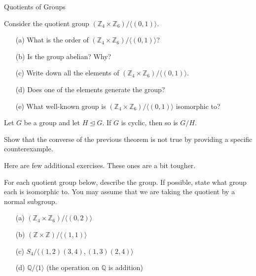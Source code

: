 \begin{section}{Quotients of Groups}
\begin{exercise}
Consider the quotient group $(\mathbb{Z}_4\times \mathbb{Z}_6)/\langle (0,1)\rangle$.
\begin{enumerate}
\item[(a)] What is the order of $(\mathbb{Z}_4\times \mathbb{Z}_6)/\langle (0,1)\rangle$?
\item[(b)] Is the group abelian?  Why?
\item[(c)] Write down all the elements of $(\mathbb{Z}_4\times \mathbb{Z}_6)/\langle (0,1)\rangle$.
\item[(d)] Does one of the elements generate the group?
\item[(e)] What well-known group is $(\mathbb{Z}_4\times \mathbb{Z}_6)/\langle (0,1)\rangle$ isomorphic to?
\end{enumerate}
\end{exercise}

\begin{theorem}
Let $G$ be a group and let $H\trianglelefteq G$.  If $G$ is cyclic, then so is $G/H$.
\end{theorem}

\begin{problem}
Show that the converse of the previous theorem is not true by providing a specific counterexample.
\end{problem}

Here are few additional exercises.  These ones are a bit tougher.

\begin{exercise}
For each quotient group below, describe the group.  If possible, state what group each is isomorphic to.  You may assume that we are taking the quotient by a normal subgroup. 
\begin{enumerate}
\item[(a)] $(\mathbb{Z}_4\times \mathbb{Z}_6)/\langle (0,2)\rangle$
\item[(b)] $(\mathbb{Z}\times \mathbb{Z})/\langle (1,1)\rangle$
\item[(c)] $S_4/\langle (1,2)(3,4),(1,3)(2,4)\rangle$
\item[(d)] $\mathbb{Q}/\langle 1\rangle$ (the operation on $\mathbb{Q}$ is addition)
\end{enumerate}
\end{exercise}

\end{section}